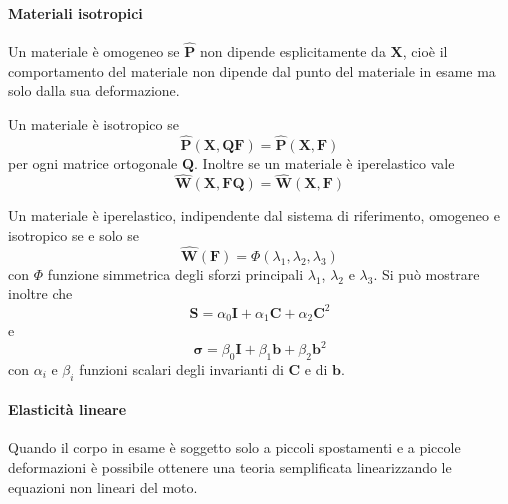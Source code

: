 \paragraph{Materiali isotropici}
Un materiale è omogeneo se $\widehat{\mathbf{P}}$ non dipende esplicitamente da $\mathbf{X}$, cioè il comportamento del materiale non dipende dal punto del materiale in esame ma solo dalla sua deformazione.

Un materiale è isotropico se
$$\widehat{\mathbf{P}}(\mathbf{X},\mathbf{Q}\mathbf{F}) = \widehat{\mathbf{P}}(\mathbf{X},\mathbf{F}) $$
per ogni matrice ortogonale $\mathbf{Q}$.
Inoltre se un materiale è iperelastico vale 
$$\widehat{\mathbf{W}}(\mathbf{X},\mathbf{F}\mathbf{Q}) = \widehat{\mathbf{W}}(\mathbf{X},\mathbf{F}) $$

Un materiale è iperelastico, indipendente dal sistema di riferimento, omogeneo e isotropico se e solo se
$$\widehat{\mathbf{W}}(\mathbf{F}) = \Phi(\lambda_1,\lambda_2,\lambda_3) $$
con $\Phi$ funzione simmetrica degli sforzi principali $\lambda_1$, $\lambda_2$ e $\lambda_3$.
Si può mostrare inoltre che
$$\mathbf{S}=\alpha_0\mathbf{I}+\alpha_1\mathbf{C}+\alpha_2\mathbf{C}^2 $$
e
$$\boldsymbol{\sigma}=\beta_0\mathbf{I}+\beta_1\mathbf{b}+\beta_2\mathbf{b}^2 $$
con $\alpha_i$ e $\beta_i$ funzioni scalari degli invarianti di $\mathbf{C}$  e di $\mathbf{b}$.
\paragraph{Elasticità lineare}
Quando il corpo in esame è soggetto solo a piccoli spostamenti e a piccole deformazioni è possibile ottenere una teoria semplificata linearizzando le equazioni non lineari del moto.

